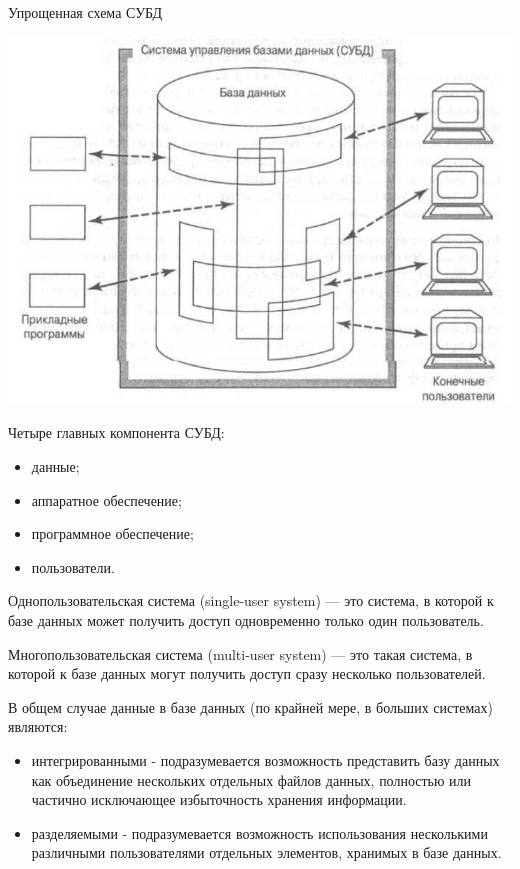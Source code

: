 \documentclass{beamer}
\begin{document}
\begin{frame}
\begin{block}{Упрощенная схема СУБД}
\begin{center}
\includegraphics[scale=0.5]{images/shema-01.png}
\end{center}
\end{block}
\end{frame}

\begin{frame}
Четыре главных компонента СУБД:
\begin{itemize}
\item данные;
\item аппаратное обеспечение;
\item программное обеспечение;
\item пользователи.
\end{itemize}

Однопользовательская система (single-user system) — это система, в которой к базе данных может получить доступ одновременно только один пользователь. 

Многопользовательская система (multi-user system) — это такая система, в которой к базе данных могут получить доступ сразу несколько пользователей.

В общем случае данные в базе данных (по крайней мере, в больших системах) являются:
\begin{itemize}
\item интегрированными - подразумевается возможность представить базу
данных как объединение нескольких отдельных файлов данных, полностью или частично исключающее избыточность хранения информации.
\item разделяемыми - подразумевается возможность использования несколькими различными пользователями отдельных элементов, хранимых в базе данных.
\end{itemize}
\end{frame}
\end{document}
